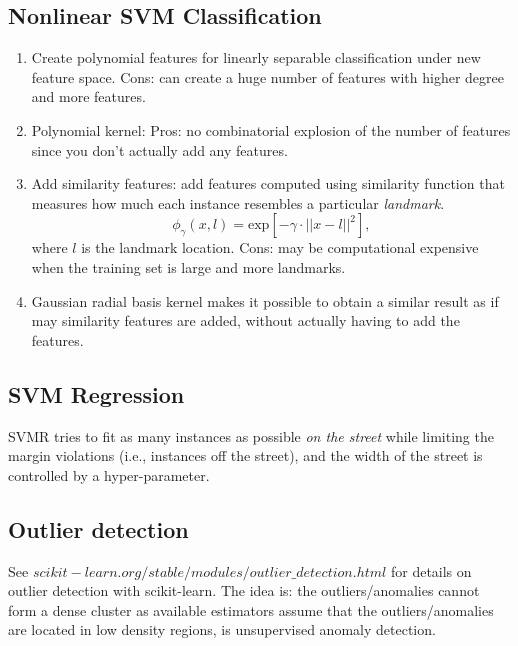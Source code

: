 \documentclass[12pt,oneside,a4paper]{article}
\numberwithin{equation}{section}
\begin{document}
\subsection{Nonlinear SVM Classification}

\begin{enumerate}
\item Create polynomial features for linearly separable classification under new feature space. Cons: can create a huge number of features with higher degree and more features. 
\item Polynomial kernel:  Pros: no combinatorial explosion of the number of features since you don't actually add any features.

\item Add similarity features: add features computed using similarity function that measures how much each instance resembles a particular \emph{landmark}.
\begin{equation}
\phi_\gamma (x, l) = \textrm{exp}\left[-\gamma \cdot ||x - l||^2\right],
\end{equation}
where $l$ is the landmark location. Cons: may be computational expensive when the training set is large and more landmarks.

\item Gaussian radial basis kernel makes it possible to obtain a similar result as if may similarity features are added, without actually having to add the features. 
\end{enumerate}
\subsection{SVM Regression}

SVMR tries to fit as many instances as possible \emph{on the street} while limiting the margin violations (i.e., instances off the street), and the width of the street is controlled by a hyper-parameter.

\subsection{Outlier detection}
See \href{https://scikit-learn.org/stable/modules/outlier_detection.html}{$scikit-learn.org/stable/modules/outlier\_detection.html$} for details on outlier detection with scikit-learn. The idea is: the outliers/anomalies cannot form a dense cluster as available estimators assume that the outliers/anomalies are located in low density regions, is unsupervised anomaly detection.
\end{document}
